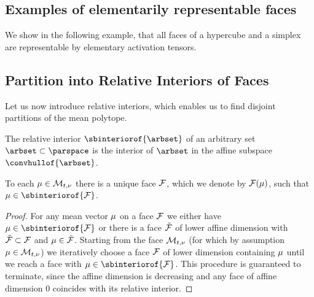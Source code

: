 \subsection{Examples of elementarily representable faces}

We show in the following example, that all faces of a hypercube and a simplex are representable by elementary activation tensors.





\subsection{Partition into Relative Interiors of Faces}

Let us now introduce relative interiors, which enables us to find disjoint partitions of the mean polytope.

\begin{definition}
    \label{def:relativeInterior}
    The relative interior $\sbinteriorof{\arbset}$ of an arbitrary set $\arbset\subset\parspace$ is the interior of $\arbset$ in the affine subspace $\convhullof{\arbset}$.
\end{definition}


\begin{lemma}
    \label{lem:faceToMean}
    To each $\mu\in\mathcal{M}_{t,\nu}$ there is a unique face $\mathcal{F}$, which we denote by $\mathcal{F}(\mu)$, such that $\meanparam\in\sbinteriorof{\facesymbol}$.
\end{lemma}
\begin{proof}
    For any mean vector $\mu$ on a face $\mathcal{F}$ we either have $\meanparam\in\sbinteriorof{\facesymbol}$ or there is a face $\tilde{\mathcal{F}}$ of lower affine dimension with $\tilde{\mathcal{F}}\subset\mathcal{F}$ and $\mu\in\tilde{\mathcal{F}}$.
    Starting from the face $\mathcal{M}_{t,\nu}$ (for which by assumption $\mu\in\mathcal{M}_{t,\nu}$) we iteratively choose a face $\mathcal{F}$ of lower dimension containing $\mu$ until we reach a face with $\meanparam\in\sbinteriorof{\facesymbol}$.
    This procedure is guaranteed to terminate, since the affine dimension is decreasing and any face of affine dimension $0$ coincides with its relative interior.
\end{proof}


